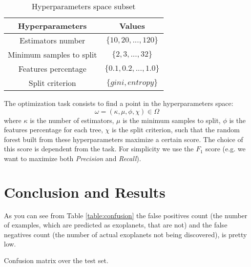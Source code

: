 \documentclass[11pt, a4paper]{article}
\begin{document}
\begin{multicols}{2}
  \begin{table}[H]
    \centering
    \begin{tabular}{|c c|}
      \hline
      Hyperparameters & Values \\
      \hline\hline
      Estimators number & $\{10,20,...,120\}$ \\
      \hline
      Minimum samples to split & $\{2,3,...,32\}$ \\
      \hline
      Features percentage & $\{0.1,0.2,...,1.0\}$ \\
      \hline
      Split criterion & $\{gini, entropy\}$ \\
      \hline
    \end{tabular}
    \caption{Hyperparameters space subset}
    \label{table:hyperparameters}
  \end{table}

  The optimization task consists to find a point in the hyperparameters space:
  \[\omega=(\kappa, \mu, \phi, \chi)\in\Omega\]
  where $\kappa$ is the number of estimators, $\mu$ is the minimum samples to split, $\phi$ is the features percentage for each tree, $\chi$ is the split criterion, such that the random forest built from these hyperparameters maximize a certain score. The choice of this score is dependent from the task. For simplicity we use the $F_{1}$ score (e.g. we want to maximize both \textit{Precision} and \textit{Recall}).

\section{Conclusion and Results}
  As you can see from Table \ref{table:confusion} the false positives count (the number of examples, which are predicted as exoplanets, that are not) and the false negatives count (the number of actual exoplanets not being discovered), is pretty low.
  \begin{table}[H]
    \centering
    \caption{Confusion matrix over the test set.}
    \label{table:confusion}
  \end{table}


\end{multicols}
\end{document}
